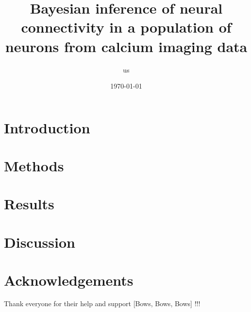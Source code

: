 \documentclass[amsmath, amssymb]{revtex4}
\begin{document}
\author{us}

\date{\today}

\title{Bayesian inference of neural connectivity in a population of neurons from 
calcium imaging data}


\begin{abstract}

\end{abstract}

\maketitle
\tableofcontents

\section{Introduction}
\label{intro}


\section{Methods}
\label{sec:methods}



\section{Results}
\label{sec:results}


\section{Discussion}
\label{sec:discussion}


\section*{Acknowledgements}
Thank everyone for their help and support [Bows, Bows, Bows] !!!



\end{document}
